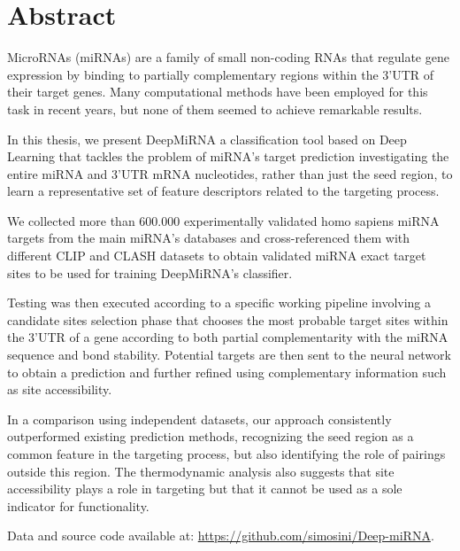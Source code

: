 \chapter*{Abstract}

MicroRNAs (miRNAs) are a family of small non-coding RNAs that regulate gene expression by binding to partially complementary regions within the 3’UTR of their target genes. Many computational methods have been employed for this task in recent years, but none of them seemed to achieve remarkable results.

In this thesis, we present DeepMiRNA a classification tool based on Deep Learning that  tackles the problem of miRNA's target prediction investigating the entire miRNA and 3'UTR mRNA nucleotides, rather than just the seed region, to learn a representative set of feature descriptors related to the targeting process. 

We collected more than 600.000 experimentally validated homo sapiens miRNA targets from the main miRNA's databases and cross-referenced them with different CLIP and CLASH datasets to obtain validated miRNA exact target sites to be used for training DeepMiRNA's classifier. 

Testing was then executed according to a specific working pipeline involving a candidate sites selection phase that chooses the most probable target sites within the 3'UTR of a gene according to both partial complementarity with the miRNA sequence and bond stability. Potential targets are then sent to the neural network to obtain a prediction and further refined using complementary information such as site accessibility. 

In a comparison using independent datasets, our approach consistently outperformed existing prediction methods, recognizing the seed region as a common feature in the targeting process, but also identifying the role of pairings outside this region. The thermodynamic analysis also suggests that site accessibility plays a role in targeting but that it cannot be used as a sole indicator for functionality.

Data and source code available at: \url{https://github.com/simosini/Deep-miRNA}.